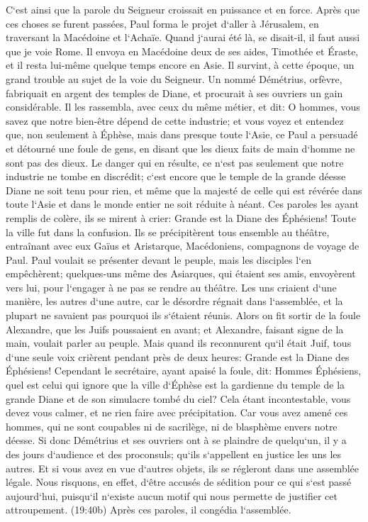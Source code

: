 \verse C`est ainsi que la parole du Seigneur croissait en puissance et en force. 
\verse Après que ces choses se furent passées, Paul forma le projet d`aller à Jérusalem, en traversant la Macédoine et l`Achaïe. Quand j`aurai été là, se disait-il, il faut aussi que je voie Rome. 
\verse Il envoya en Macédoine deux de ses aides, Timothée et Éraste, et il resta lui-même quelque temps encore en Asie. 
\verse Il survint, à cette époque, un grand trouble au sujet de la voie du Seigneur. 
\verse Un nommé Démétrius, orfèvre, fabriquait en argent des temples de Diane, et procurait à ses ouvriers un gain considérable. 
\verse Il les rassembla, avec ceux du même métier, et dit: O hommes, vous savez que notre bien-être dépend de cette industrie; 
\verse et vous voyez et entendez que, non seulement à Éphèse, mais dans presque toute l`Asie, ce Paul a persuadé et détourné une foule de gens, en disant que les dieux faits de main d`homme ne sont pas des dieux. 
\verse Le danger qui en résulte, ce n`est pas seulement que notre industrie ne tombe en discrédit; c`est encore que le temple de la grande déesse Diane ne soit tenu pour rien, et même que la majesté de celle qui est révérée dans toute l`Asie et dans le monde entier ne soit réduite à néant. 
\verse Ces paroles les ayant remplis de colère, ils se mirent à crier: Grande est la Diane des Éphésiens! 
\verse Toute la ville fut dans la confusion. Ils se précipitèrent tous ensemble au théâtre, entraînant avec eux Gaïus et Aristarque, Macédoniens, compagnons de voyage de Paul. 
\verse Paul voulait se présenter devant le peuple, mais les disciples l`en empêchèrent; 
\verse quelques-uns même des Asiarques, qui étaient ses amis, envoyèrent vers lui, pour l`engager à ne pas se rendre au théâtre. 
\verse Les uns criaient d`une manière, les autres d`une autre, car le désordre régnait dans l`assemblée, et la plupart ne savaient pas pourquoi ils s`étaient réunis. 
\verse Alors on fit sortir de la foule Alexandre, que les Juifs poussaient en avant; et Alexandre, faisant signe de la main, voulait parler au peuple. 
\verse Mais quand ils reconnurent qu`il était Juif, tous d`une seule voix crièrent pendant près de deux heures: Grande est la Diane des Éphésiens! 
\verse Cependant le secrétaire, ayant apaisé la foule, dit: Hommes Éphésiens, quel est celui qui ignore que la ville d`Éphèse est la gardienne du temple de la grande Diane et de son simulacre tombé du ciel? 
\verse Cela étant incontestable, vous devez vous calmer, et ne rien faire avec précipitation. 
\verse Car vous avez amené ces hommes, qui ne sont coupables ni de sacrilège, ni de blasphème envers notre déesse. 
\verse Si donc Démétrius et ses ouvriers ont à se plaindre de quelqu`un, il y a des jours d`audience et des proconsuls; qu`ils s`appellent en justice les uns les autres. 
\verse Et si vous avez en vue d`autres objets, ils se régleront dans une assemblée légale. 
\verse Nous risquons, en effet, d`être accusés de sédition pour ce qui s`est passé aujourd`hui, puisqu`il n`existe aucun motif qui nous permette de justifier cet attroupement. 
\verse (19:40b) Après ces paroles, il congédia l`assemblée. 

